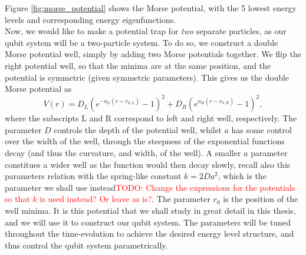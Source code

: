 \documentclass{subfiles}
\begin{document}
Figure \ref{fig:morse_potential} shows the Morse potential, with the 5 lowest energy levels and corresponding energy eigenfunctions. \\


Now, we would like to make a potential trap for \emph{two} separate particles, as our qubit system will be a two-particle system. To do so, we construct a double Morse potential well, simply by adding two Morse potentials together. We flip the right potential well, so that the minima are at the same position, and the potential is symmetric (given symmetric parameters). This gives us the double Morse potential as
\begin{equation}
    V(r) = D_L(e^{-a_L(r-r_{0,L})} - 1)^2 + D_R(e^{a_R(r-r_{0,R})} - 1)^2\label{eq:double_well_morse_potential},
\end{equation}
where the subscripts L and R correspond to left and right well, respectively. The parameter $D$ controls the depth of the potential well, whilst $a$ has some control over the width of the well, through the steepness of the exponential functions decay (and thus the curvature, and width, of the well). A smaller $a$ parameter constitues a wider well as the function would then decay slowly, recall also this parameters relation with the spring-like constant $k=2Da^2$, which is the parameter we shall use instead\textcolor{red}{TODO: Change the expressions for the potentials so that $k$ is used instead? Or leave as is?}. The parameter $r_0$ is the position of the well minima. It is this potential that we shall study in great detail in this thesis, and we will use it to construct our qubit system. The parameters will be tuned throughout the time-evolution to achieve the desired energy level structure, and thus control the qubit system parametrically.
\end{document}
